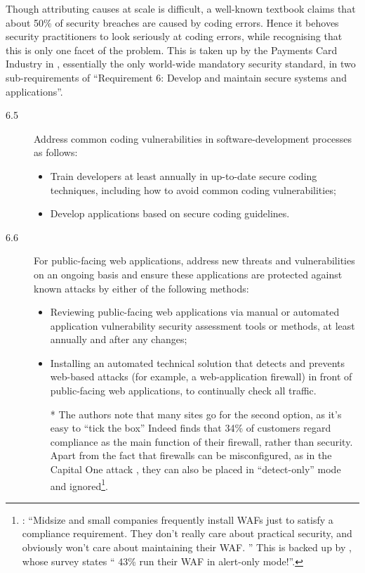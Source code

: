 \documentclass{llncs}
\begin{document}
\par
Though attributing causes at scale is difficult, a well-known textbook \cite{McGraw2006} claims that about 50\% of security breaches are caused by coding errors. Hence it behoves security practitioners to look seriously at coding errors, while recognising that this is only one facet of the problem. This is taken up by the Payments Card Industry in \cite{PCI2018b}, essentially the only world-wide mandatory security standard, in two sub-requirements of ``Requirement 6: Develop and maintain secure systems and applications''.

\begin{description}
\item[6.5] Address common coding vulnerabilities in software-development processes as follows:
\begin{itemize}
\item Train developers at least annually in up-to-date secure coding techniques, including how to avoid common coding vulnerabilities;
\item Develop applications based on secure coding guidelines.
\end{itemize}
\item[6.6] For public-facing web applications, address new threats and vulnerabilities on an ongoing basis and ensure these applications are protected against known attacks by either of the following methods:
\begin{itemize}
\item Reviewing public-facing web applications via manual or automated application vulnerability security assessment tools or methods, at least annually and after any changes;
\item Installing an automated technical solution that detects and prevents web-based attacks (for example, a web-application firewall) in front of public-facing web applications, to continually check all traffic.
\item[*]The authors note that many sites go for the second option, as it's easy to ``tick the box'' Indeed \cite{Ponemon2019a} finds that 34\% of customers regard compliance as the main function of their firewall, rather than security. Apart from the fact that firewalls can be misconfigured, as in the Capital One attack \cite{Krebs2019s}, they can also be placed in ``detect-only'' mode and ignored\footnote{\cite{Kolochenko2016a}: ``Midsize and small companies frequently install WAFs just to satisfy a compliance requirement. They don't really care about practical security, and obviously won't care about maintaining their WAF. '' This is backed up by \cite{Ponemon2019a}, whose survey states `` 43\% run their WAF in alert-only mode!''.}. 
\end{itemize}
\end{description}
\end{document}
